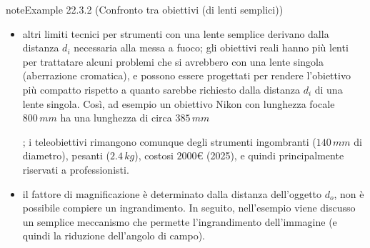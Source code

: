 \documentclass[letterpaper,10pt,italian]{jupyterBook}
\begin{document}
\begin{sphinxadmonition}{note}{Example 22.3.2 (Confronto tra obiettivi (di lenti semplici))}
\begin{itemize}
\item {} 
\sphinxAtStartPar
altri limiti tecnici per strumenti con una lente semplice derivano dalla distanza \(d_i\) necessaria alla messa a fuoco; gli obiettivi reali hanno più lenti per trattatare alcuni problemi che si avrebbero con una lente singola (aberrazione cromatica), e possono essere progettati per rendere l’obiettivo più compatto rispetto a quanto sarebbe richiesto dalla distanza \(d_i\) di una lente singola. Così, ad esempio un obiettivo Nikon con lunghezza focale \(800 \, mm\) ha una lunghezza di circa \(385\, mm\)%
\begin{footnote}[3]\sphinxAtStartFootnote
{}
%
\end{footnote}; i teleobiettivi rimangono comunque degli strumenti ingombranti (\(140 \, mm\) di diametro), pesanti (\(2.4 \, kg\)), costosi \(2000\)€ (2025), e quindi principalmente riservati a professionisti.

\item {} 
\sphinxAtStartPar
il fattore di magnificazione è determinato dalla distanza dell’oggetto \(d_o\), non è possibile compiere un ingrandimento. In seguito, nell’esempio {\hyperref[\detokenize{ch/waves/optics-lens:zoom}]{}} viene discusso un semplice meccanismo che permette l’ingrandimento dell’immagine (e quindi la riduzione dell’angolo di campo).

\end{itemize}
\end{sphinxadmonition}
\end{document}
